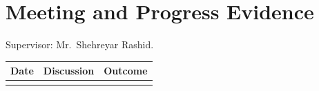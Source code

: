 \chapter{Meeting and Progress Evidence}
Supervisor: Mr.\ Shehreyar Rashid.

\begin{longtable}{P{0.15\textwidth}P{0.4\textwidth}P{0.3\textwidth}}
\toprule
Date & Discussion & Outcome\\
\midrule
\endhead
{} &  & \\
\bottomrule
\end{longtable}

